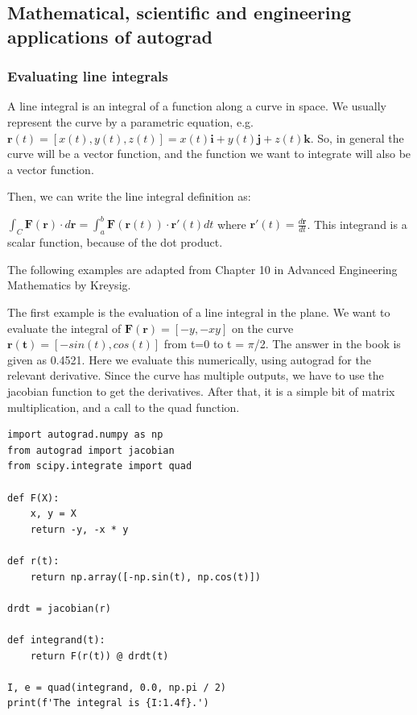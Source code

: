 \documentclass[11pt]{article}
\begin{document}
\subsection{Mathematical, scientific and engineering applications of autograd}
\label{sec:org2c3f713}

\subsubsection{Evaluating line integrals}
\label{sec:org3ebacd3}

A line integral is an integral of a function along a curve in space. We usually represent the curve by a parametric equation, e.g. \(\mathbf{r}(t) = [x(t), y(t), z(t)] = x(t)\mathbf{i} + y(t)\mathbf{j} + z(t)\mathbf{k}\).  So, in general the curve will be a vector function, and the function we want to integrate will also be a vector function.

Then, we can write the line integral definition as:

\(\int_C \mathbf{F(r)} \cdot d\mathbf{r} = \int_a^b \mathbf{F}(\mathbf{r}(t)) \cdot \mathbf{r'}(t) dt\) where \(\mathbf{r'}(t) = \frac{d\mathbf{r}}{dt}\). This integrand is a scalar function, because of the dot product.

The following examples are adapted from Chapter 10 in Advanced Engineering Mathematics by Kreysig.

The first example is the evaluation of  a line integral in the plane. We want to evaluate the integral of \(\mathbf{F(r)}=[-y, -xy]\) on the curve \(\mathbf{r(t)}=[-sin(t), cos(t)]\) from t=0 to t = \(\pi\)/2. The answer in the book is given as 0.4521. Here we evaluate this numerically, using autograd for the relevant derivative. Since the curve has multiple outputs, we have to use the jacobian function to get the derivatives. After that, it is a simple bit of matrix multiplication, and a call to the quad function.

\begin{verbatim}
import autograd.numpy as np
from autograd import jacobian
from scipy.integrate import quad

def F(X):
    x, y = X
    return -y, -x * y

def r(t):
    return np.array([-np.sin(t), np.cos(t)])

drdt = jacobian(r)

def integrand(t):
    return F(r(t)) @ drdt(t)

I, e = quad(integrand, 0.0, np.pi / 2)
print(f'The integral is {I:1.4f}.')
\end{verbatim}
\end{document}
